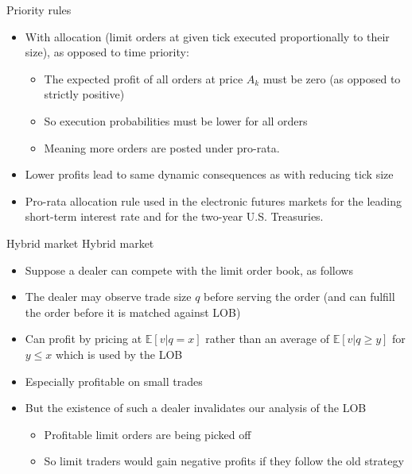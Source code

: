 \documentclass[english,10pt
,aspectratio=169
]{beamer}
\begin{document}
\begin{frame}{Priority rules}
	\begin{itemize}
		\item With  allocation (limit orders at given tick executed proportionally to their size), as opposed to \alert{time priority}:
		\begin{itemize}
			\item The expected profit of all orders at price $A_k$ must be zero (as opposed to strictly positive)
			\item So execution probabilities must be lower for all orders
			\item Meaning more orders are posted under pro-rata.
		\end{itemize}
		\item Lower profits lead to same dynamic consequences as with reducing tick size
		\item Pro-rata allocation rule used in the electronic futures markets for the leading short-term interest rate and for the two-year U.S. Treasuries.
	\end{itemize}
\end{frame}


\begin{frame}{Hybrid market}
	Hybrid market
	\begin{itemize}
		\item Suppose a dealer can compete with the limit order book, as follows
		\item The dealer may observe trade size $q$ before serving the order (and can fulfill the order before it is matched against LOB)
		\item Can profit by pricing at $\mathbb{E}[v|q=x]$ rather than an average of $\mathbb{E}[v|q \geq y]$ for $y \leq x$ which is used by the LOB
		\item Especially profitable on small trades
		\item But the existence of such a dealer invalidates our analysis of the LOB
		\begin{itemize}
			\item Profitable limit orders are being picked off
			\item So limit traders would gain negative profits if they follow the old strategy
		\end{itemize}
	\end{itemize}
\end{frame}
\end{document}
